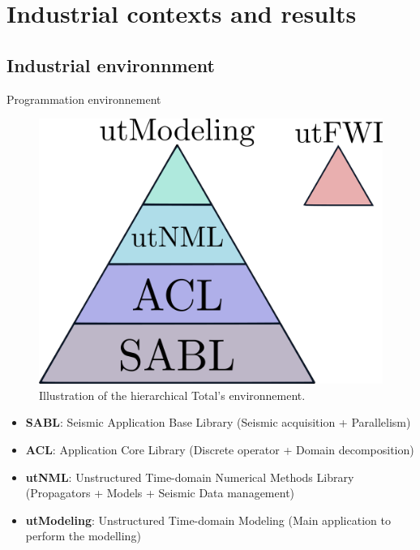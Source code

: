 
\section{Industrial contexts and results}

\subsection{Industrial environnment}
\begin{frame}{Programmation environnement}

  \begin{multicols}{2}
    \begin{figure}[H]
      \centering
      \includegraphics[scale=0.12]{image/carbon.pdf}
      \caption*{Illustration of the hierarchical Total's environnement.}
      \label{carbon}
    \end{figure}

    \columnbreak

    \begin{itemize}
      \small
    \item<2-> \textbf{SABL}: Seismic Application Base Library (Seismic acquisition + Parallelism)
    \item<3-> \textbf{ACL}: Application Core Library  (Discrete operator + Domain decomposition)
    \item<4-> \textbf{utNML}: Unstructured Time-domain Numerical Methods Library (Propagators + Models + Seismic Data management)
    \item<5-> \textbf{utModeling}: Unstructured Time-domain Modeling (Main application to perform the modelling)
    \end{itemize}
  \end{multicols}

\end{frame}


